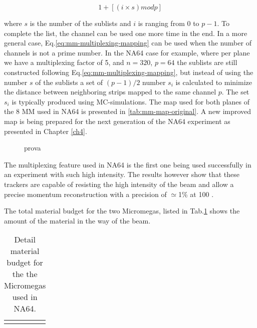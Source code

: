 \begin{equation}
\label{eq:mm-multiplexing-mapping}
1 + [(i \times s) mod p]
\end{equation}

where $s$ is the number of the sublists and $i$ is ranging from 0 to $p-1$. To complete the list, the channel can be used one more time in the end. In a more general case, Eq.\ref{eq:mm-multiplexing-mapping} can be used when the number of channels is not a prime number. In the NA64 case for example, where per plane we have a multiplexing factor of 5, and $n=320$, $p=64$ the sublists are still constructed following Eq.\ref{eq:mm-multiplexing-mapping}, but instead of using the number $s$ of the sublists a set of $(p-1)/2$ number $s_i$ is calculated to minimize the distance between neighboring strips mapped to the same channel $p$. The set $s_i$ is typically produced using MC-simulations. The map used for both planes of the 8 MM used in NA64 is presented in \ref{tab:mm-map-original}. A new improved map is being prepared for the next generation of the NA64 experiment as presented in Chapter \ref{ch4}.

\begin{figure}[bth!]
\centering
\caption[example of the readout of a multiplexing detector]{prova}
\label{fig:multiplexing-example}
\end{figure}

The multiplexing feature used in NA64 is the first one being used successfully in an experiment with such high intensity. The results however show that these trackers are capable of resisting the high intensity of the beam and allow a precise momentum reconstruction with a precision of $\simeq$1\% at 100 \si{\gev} \cite{Banerjee:2017mdu}.

The total material budget for the two Micromegas, listed in Tab.\ref{tab:mm-mbudget} shows the amount of the material in the way of the beam. 

\begin{table}[bth!]
\centering
\begin{tabular}{|l|c|c|}
&&
\end{tabular}
\caption[material budget MM]{Detail material budget for the the Micromegas used in NA64.}
\label{tab:mm-mbudget}
\end{table}

